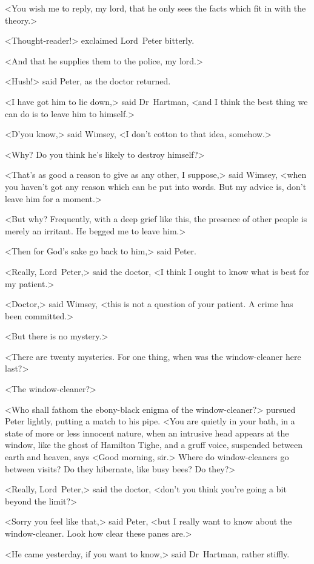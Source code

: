 <You wish me to reply, my lord, that he only sees the facts which fit in with the theory.>

<Thought-reader!> exclaimed Lord~Peter bitterly.

<And that he supplies them to the police, my lord.>

<Hush!> said Peter, as the doctor returned.

<I have got him to lie down,> said Dr~Hartman, <and I think the best thing we can do is to leave him to himself.>

<D'you know,> said Wimsey, <I don't cotton to that idea, somehow.>

<Why? Do you think he's likely to destroy himself?>

<That's as good a reason to give as any other, I suppose,> said Wimsey, <when you haven't got any reason which can be put into words. But my advice is, don't leave him for a moment.>

<But why? Frequently, with a deep grief like this, the presence of other people is merely an irritant. He begged me to leave him.>

<Then for God's sake go back to him,> said Peter.

<Really, Lord~Peter,> said the doctor, <I think I ought to know what is best for my patient.>

<Doctor,> said Wimsey, <this is not a question of your patient. A crime has been committed.>

<But there is no mystery.>

<There are twenty mysteries. For one thing, when was the window-cleaner here last?>

<The window-cleaner?>

<Who shall fathom the ebony-black enigma of the window-cleaner?> pursued Peter lightly, putting a match to his pipe. <You are quietly in your bath, in a state of more or less innocent nature, when an intrusive head appears at the window, like the ghost of Hamilton Tighe, and a gruff voice, suspended between earth and heaven, says <Good morning, sir.> Where do window-cleaners go between visits? Do they hibernate, like busy bees? Do they\longdash?>

<Really, Lord~Peter,> said the doctor, <don't you think you're going a bit beyond the limit?>

<Sorry you feel like that,> said Peter, <but I really want to know about the window-cleaner. Look how clear these panes are.>

<He came yesterday, if you want to know,> said Dr~Hartman, rather stiffly.

